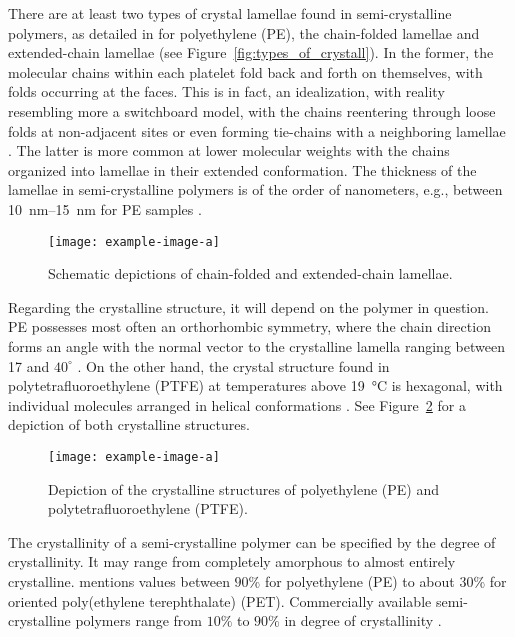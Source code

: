 There are at least two types of crystal lamellae found in semi-crystalline polymers, as detailed in \cite{andersonMorphologyIsothermallyBulk1964} for polyethylene (PE), the  chain-folded lamellae and extended-chain lamellae (see Figure~\eqref{fig:types_of_crystall}).
In the former, the molecular chains within each platelet fold back and forth on themselves, with folds occurring at the faces.
This is in fact, an idealization, with reality resembling more a switchboard model, with the chains reentering through loose folds at non-adjacent sites or even forming tie-chains with a neighboring lamellae \citep{gsellEvolutionMicrostructureSemicrystalline1994}.
The latter is more common at lower molecular weights with the chains organized into lamellae in their extended conformation.
The thickness of the lamellae in semi-crystalline polymers is of the order of nanometers, e.g., between \SIrange{10}{15}{\nano\meter} for PE samples \citep{argonPhysicsDeformationFracture2013a}.
\begin{figure}[hbtp]
	\texttt{[image: example-image-a]}
	\caption{Schematic depictions of chain-folded and extended-chain lamellae.}
\label{fig:types_of_crystall}
\end{figure}

Regarding the crystalline structure, it will depend on the polymer in question.
PE possesses most often an orthorhombic symmetry, where the chain direction forms an angle with the normal vector to the crystalline lamella ranging between 17 and $40^\circ$ \citep{nikolovMicroMacroConstitutive2000}.
On the other hand, the crystal structure found in polytetrafluoroethylene (PTFE) at temperatures above \SI{19}{\celsius} is hexagonal, with individual molecules arranged in helical conformations \citep{bergstromMechanicsSolidPolymers2015}.
See Figure~\ref{fig:crystalline_structure_PE_PTFE} for a depiction of both crystalline structures.
\begin{figure}[hbtp]
	\texttt{[image: example-image-a]}
	\caption{Depiction of the crystalline structures of polyethylene (PE) and polytetrafluoroethylene (PTFE).}
\label{fig:crystalline_structure_PE_PTFE}
\end{figure}

The crystallinity of a semi-crystalline polymer can be specified by the degree of crystallinity.
It may range from completely amorphous to almost entirely crystalline.
\cite{wardIntroductionMechanicalProperties2004} mentions values between $90\%$ for polyethylene (PE) to about $30\%$ for oriented poly(ethylene terephthalate) (PET).
Commercially available semi-crystalline polymers range from $10\%$ to $90\%$ in degree of crystallinity \citep{vandommelenMicromechanicalModelingElastoviscoplastic2003}.

